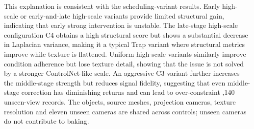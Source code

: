 \documentclass[times,twocolumn,final]{elsarticle}
\providecommand{\DIFadd}[1]{{\protect\color{blue} \sf #1}} %
\providecommand{\DIFdel}[1]{{\protect\color{red} \scriptsize #1}} %
\providecommand{\DIFaddbegin}{} %
\providecommand{\DIFaddend}{} %
\providecommand{\DIFdelbegin}{} %
\providecommand{\DIFdelend}{} %
\begin{document}
\DIFdel{This explanation is consistent with the scheduling-variant results.
Early high-scale or early-and-late high-scale variants provide limited structural gain, indicating that early strong intervention is unstable. The late-stage high-scale configuration C4 obtains a high structural score but shows a substantial decrease in Laplacian variance, making it a typical Trap variant where structural metrics improve while texture is flattened. Uniform high-scale variants similarly improve condition adherence but lose texture detail, showing that the issue is not solved by a stronger ControlNet-like scale. An aggressive C3 variant further increases the middle-stage strength but reduces signal fidelity, suggesting that even middle-stage correction has diminishing returns and can lead to over-constraint}\DIFdelend \DIFaddbegin \DIFadd{,140 unseen-view records. The objects, source meshes, projection cameras, texture resolution and eleven unseen cameras are shared across controls; unseen cameras do not contribute to baking}\DIFaddend .

\DIFdelbegin %

\end{document}
